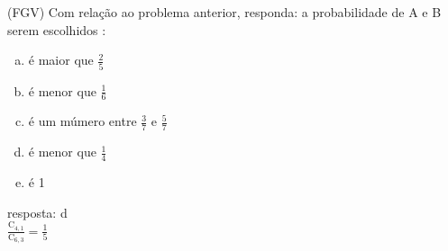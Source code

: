 \begin{ex}
 	(FGV) Com relação ao problema anterior, responda: a probabilidade de A e B serem escolhidos :
    \begin{enumerate}[(a)]
    \item é maior que $\frac{2}{5}$
    \item é menor que $\frac{1}{6}$
    \item é um múmero entre $\frac{3}{7}$ e $\frac{5}{7}$
    \item é menor que $\frac{1}{4}$
    \item é 1
    \end{enumerate}
      \begin{sol}
        resposta: d \\
       $\frac{\mathrm{C}_{4,1}}{\mathrm{C}_{6,3}}=\frac{1}{5}$
      \end{sol}
\end{ex}